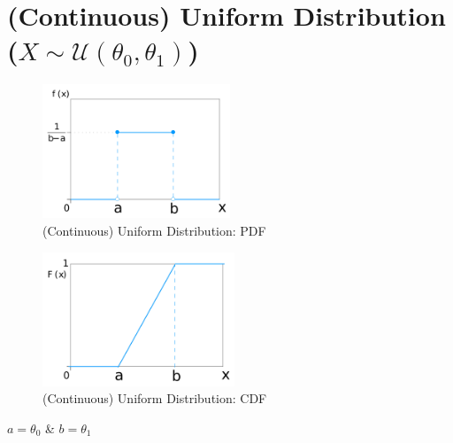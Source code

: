 \chapter{(Continuous) Uniform Distribution ($X \sim \mathcal{U}(\theta_0,\theta_1)$) \cite{ism-1,wiki/Continuous_uniform_distribution}} \label{Uniform Distribution}

\begin{table}[H]
    \begin{minipage}{0.49\linewidth}
        \begin{figure}[H]
            \centering
            \includegraphics[width=\linewidth, height=4cm, keepaspectratio]{Pictures/distributions/Uniform_Distribution_PDF.jpg}
            \caption{(Continuous) Uniform Distribution: PDF}
        \end{figure}
    \end{minipage}
    \hfill
    \begin{minipage}{0.49\linewidth}
        \begin{figure}[H]
            \centering
            \includegraphics[width=\linewidth, height=4cm, keepaspectratio]{Pictures/distributions/Uniform_Distribution_CDF.jpg}
            \caption{(Continuous) Uniform Distribution: CDF}
        \end{figure}
    \end{minipage}
\end{table}

$a = \theta_0$ \& $b = \theta_1$

